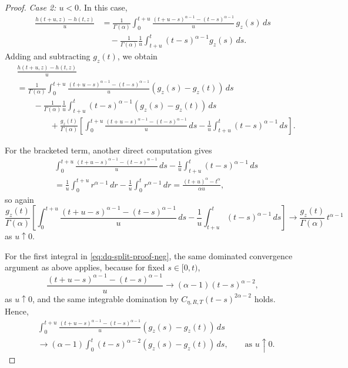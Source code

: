 \documentclass[10pt,a4paper]{amsart}
\begin{document}
\begin{proof}
\smallskip
\noindent
\emph{Case 2: $u<0$.}
In this case,
\begin{align*}
  \frac{h(t+u,z)-h(t,z)}{u}
  &=
  \frac{1}{\Gamma(\alpha)}
  \int_0^{t+u}
  \frac{(t+u-s)^{\alpha-1}-(t-s)^{\alpha-1}}{u}\,g_z(s)\,ds
  \\
  &\quad
  -
  \frac{1}{\Gamma(\alpha)}
  \frac{1}{u}\int_{t+u}^{t}(t-s)^{\alpha-1}g_z(s)\,ds.
\end{align*}
Adding and subtracting $g_z(t)$, we obtain
\begin{align}
  &\frac{h(t+u,z)-h(t,z)}{u}\nonumber\\
  &=
  \frac{1}{\Gamma(\alpha)}
  \int_0^{t+u}
  \frac{(t+u-s)^{\alpha-1}-(t-s)^{\alpha-1}}{u}
  \left(g_z(s)-g_z(t)\right)\,ds
  \nonumber\\
  &\qquad
  -
  \frac{1}{\Gamma(\alpha)}
  \frac{1}{u}\int_{t+u}^{t}(t-s)^{\alpha-1}
  \left(g_z(s)-g_z(t)\right)\,ds
  \nonumber\\
  &\qquad\qquad+
  \frac{g_z(t)}{\Gamma(\alpha)}
  \left[
    \int_0^{t+u}
    \frac{(t+u-s)^{\alpha-1}-(t-s)^{\alpha-1}}{u}\,ds
    -
    \frac{1}{u}\int_{t+u}^{t}(t-s)^{\alpha-1}\,ds
  \right].
  \label{eq:dq-split-proof-neg}
\end{align}

For the bracketed term, another direct computation gives
\begin{align*}
  &\int_0^{t+u}
  \frac{(t+u-s)^{\alpha-1}-(t-s)^{\alpha-1}}{u}\,ds
  -
  \frac{1}{u}\int_{t+u}^{t}(t-s)^{\alpha-1}\,ds
  \\
  &=
  \frac{1}{u}\int_0^{t+u}r^{\alpha-1}\,dr
  -
  \frac{1}{u}\int_0^t r^{\alpha-1}\,dr
  =
  \frac{(t+u)^\alpha-t^\alpha}{\alpha u},
\end{align*}
so again
\begin{equation}\label{eq:bracket-limit-neg}
  \frac{g_z(t)}{\Gamma(\alpha)}
  \left[
    \int_0^{t+u}
    \frac{(t+u-s)^{\alpha-1}-(t-s)^{\alpha-1}}{u}\,ds
    -
    \frac{1}{u}\int_{t+u}^{t}(t-s)^{\alpha-1}\,ds
  \right]
  \to
  \frac{g_z(t)}{\Gamma(\alpha)}\,t^{\alpha-1}
\end{equation}
as $u\uparrow0$.

For the first integral in \eqref{eq:dq-split-proof-neg}, the same dominated convergence argument as above applies, because for fixed $s\in[0,t)$,
\[
  \frac{(t+u-s)^{\alpha-1}-(t-s)^{\alpha-1}}{u}
  \to
  (\alpha-1)(t-s)^{\alpha-2},
\]
as $u\uparrow0$, and the same integrable domination by
$C_{\eta,R,T}(t-s)^{2\alpha-2}$ holds. Hence,
\begin{align}
  &\int_0^{t+u}
  \frac{(t+u-s)^{\alpha-1}-(t-s)^{\alpha-1}}{u}
  \left(g_z(s)-g_z(t)\right)\,ds
  \nonumber\\
  &\to
  (\alpha-1)\int_0^t (t-s)^{\alpha-2}\left(g_z(s)-g_z(t)\right)\,ds,
  \qquad\text{as }u\uparrow0.
  \label{eq:first-integral-limit-neg}
\end{align}


\end{proof}
\end{document}

